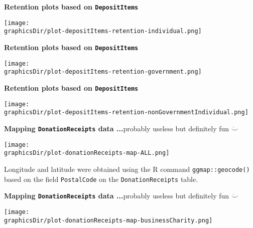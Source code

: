 \begin{frame}{\bf Retention plots based on \texttt{DepositItems}}
\tiny
\vskip 0.4cm
\begin{center}
\texttt{[image: \\graphicsDir/plot-depositItems-retention-individual.png]}
\end{center}
\end{frame}

\begin{frame}{\bf Retention plots based on \texttt{DepositItems}}
\tiny
\vskip 0.4cm
\begin{center}
\texttt{[image: \\graphicsDir/plot-depositItems-retention-government.png]}
\end{center}
\end{frame}

\begin{frame}{\bf Retention plots based on \texttt{DepositItems}}
\tiny
\vskip 0.4cm
\begin{center}
\texttt{[image: \\graphicsDir/plot-depositItems-retention-nonGovernmentIndividual.png]}
\end{center}
\end{frame}

\begin{frame}{{\bf Mapping \texttt{DonationReceipts} data ...}\;\tiny probably useless but definitely fun $\ddot\smile$}
\tiny
\vskip 0.4cm

\begin{center}
\texttt{[image: \\graphicsDir/plot-donationReceipts-map-ALL.png]}
\end{center}

\begin{flushleft}
\vskip -0.2cm
Longitude and latitude were obtained using the R command \texttt{ggmap::geocode()}
based on the field \texttt{PostalCode} on the \texttt{DonationReceipts} table.
\end{flushleft}

\end{frame}

\begin{frame}{{\bf Mapping \texttt{DonationReceipts} data ...}\;\tiny probably useless but definitely fun $\ddot\smile$}
\tiny

\vskip 0.4cm
\begin{center}
\texttt{[image: \\graphicsDir/plot-donationReceipts-map-businessCharity.png]}
\end{center}

\end{frame}

